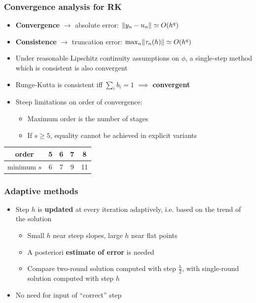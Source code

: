 \documentclass{beamer}
\begin{document}
\begin{frame} %
\frametitle{Convergence analysis for RK}
	\begin{itemize}
		\item \textbf{Convergence} $\to$ absolute error: $\lVert y_n - u_n\rVert \simeq O(h^q)$
		\item \textbf{Consistence} $\to$ truncation error: $\max_n \lVert\tau_n(h)\rVert \simeq O(h^q)$
		\item Under reasonable Lipschitz continuity assumptions on $\phi$, a single-step method which is consistent is also convergent
		\pause
		\item Runge-Kutta is consistent iff $\sum_i b_i = 1$ $\implies$ \textbf{convergent}
		\item Steep limitations on order of convergence:
		\begin{itemize}
			\item Maximum order is the number of stages
			\item If $s \ge 5$, equality cannot be achieved in explicit variants \\[15pt]
		\end{itemize}
	\end{itemize}
	\begin{center}
		\begin{tabular}{c|cccc}
			order & 5 & 6 & 7 & 8\\
			\hline
			minimum $s$ & 6 & 7 & 9 & 11 
		\end{tabular}
	\end{center}
\end{frame}


\begin{frame} %
	\frametitle{Adaptive methods}
	\begin{itemize}
		\item Step $h$ is \textbf{updated} at every iteration adaptively, i.e. based on the trend of the solution
		\begin{itemize}
			\item Small $h$ near steep slopes, large $h$ near flat points
			\item A posteriori \textbf{estimate of error} is needed
			\item Compare two-round solution computed with step $\frac{h}{2}$, with single-round solution computed with step $h$
		\end{itemize}
		\item No need for input of ``correct'' step
	\end{itemize}
\end{frame}
\end{document}
